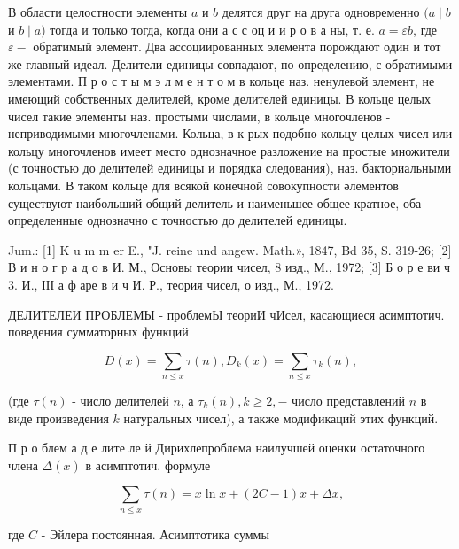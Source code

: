 \documentclass[10pt]{article}
\begin{document}
В области целостности элементы $a$ и $b$ делятся друг на друга одновременно $(a \mid b$ и $b \mid a)$ тогда и только тогда, когда они а с с оц и и р о в а ны, т. е. $a=\varepsilon b$, где $\varepsilon-$ обратимый элемент. Два ассоциированных элемента порождают один и тот же главный идеал. Делители единицы совпадают, по определению, с обратимыми элементами. П р о с т ы м э л м е н т о м в кольце наз. ненулевой элемент, не имеющий собственных делителей, кроме делителей единицы. В кольце целых чисел такие элементы наз. простыми числами, в кольце многочленов - неприводимыми многочленами. Кольца, в к-рых подобно кольцу целых чисел или кольцу многочленов имеет место однозначное разложение на простые множители (с точностью до делителей единицы и порядка следования), наз. бакториальными кольцами. В таком кольце для всякой конечной совокупности әлементов существуют наибольший общий делитель и наименьшее общее кратное, оба определенные однозначно с точностью до делителей единицы.



Jum.: [1] K u m m er E., "J. reine und angew. Math.», 1847, Bd 35, S. 319-26; [2] В и н о г р а д о в И. М., Основы теории чисел, 8 изд., М., 1972; [3] Б о р е ви ч 3. И., ІІІ а ф аре в и ч И. Р., теория чисел, о изд., М., 1972.



ДЕЛИТЕЛЕИ ПРОБЛЕМЫ - проблемЫ теориИ чИсел, касающиеся асимптотич. поведения сумматорных функций



\[

D(x)=\sum_{n \leqslant x} \tau(n), D_{k}(x)=\sum_{n \leqslant x} \tau_{k}(n),

\]



(где $\tau(n)$ - число делителей $n$, а $\tau_{k}(n), k \geqslant 2,-$ число представлений $n$ в виде произведения $k$ натуральных чисел), а также модификаций этих функций.



П р о блем а д е лите ле й Дирихлепроблема наилучшей оценки остаточного члена $\Delta(x)$ в асимптотич. формуле



\[

\sum_{n \leqslant x} \tau(n)=x \ln x+(2 C-1) x+\Delta x,

\]



где $C$ - Эйлера постоянная. Асимптотика суммы
\end{document}
